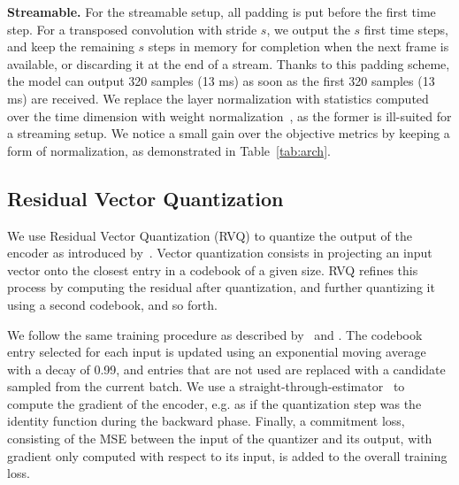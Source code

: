 {\noindent \bf Streamable.} 
For the streamable setup, all padding is put before the first time step.
For a transposed convolution with stride $s$, we output the $s$ first time steps, and keep the remaining $s$ steps in memory for completion when the next
frame is available, or discarding it at the end of a stream.
Thanks to this padding scheme, the model can output 320 samples (13 ms) as soon as the first 320 samples (13 ms)
are received. We replace the layer normalization with statistics computed over the time dimension with 
weight normalization~\citep{salimans2016weight}, as the former is ill-suited for a streaming setup.
We notice a small gain over the objective metrics by keeping a form of normalization, as demonstrated in Table~\ref{tab:arch}.



\subsection{Residual Vector Quantization}
\label{sec:rvq}

We use Residual Vector Quantization (RVQ) to quantize the output of the encoder as introduced by~\citet{zeghidour2021soundstream}. Vector quantization consists in projecting an input vector onto the closest
entry in a codebook of a given size. RVQ refines this process by computing the residual after quantization,
and further quantizing it using a second codebook, and so forth. 

We follow the same training procedure as described by~\citet{dhariwal2020jukebox} and \citet{zeghidour2021soundstream}. The codebook entry selected for each input is updated using an exponential moving average with a decay of 0.99, and entries that are not used are replaced with a candidate sampled from
the current batch. We use a straight-through-estimator~\citep{bengio2013estimating} to compute the gradient of the encoder, e.g. as if the quantization step was the identity function during the backward phase. Finally, a commitment loss, consisting of the MSE between the input of the quantizer and its output, with gradient only computed with respect to its input, is added to the overall training loss.

